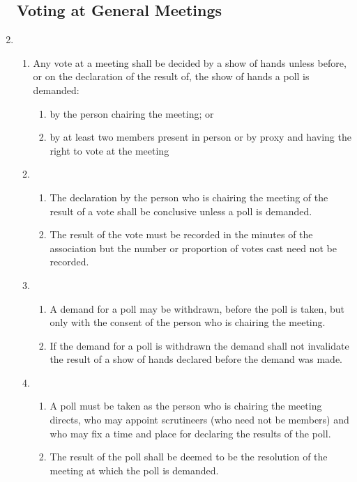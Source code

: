 \begin{enumerate}
\subsection{Voting at General Meetings}
\item
  \begin{enumerate}
  \item
    Any vote at a meeting shall be decided by a show of hands unless
    before, or on the declaration of the result of, the show of hands a
    poll is demanded:
    \begin{enumerate}
    \item
      by the person chairing the meeting; or
    \item
      by at least two members present in person or by proxy and having
      the right to vote at the meeting
    \end{enumerate}
  \item
    \begin{enumerate}
    \item
      The declaration by the person who is chairing the meeting of the
      result of a vote shall be conclusive unless a poll is demanded.
    \item
      The result of the vote must be recorded in the minutes of the
      association but the number or proportion of votes cast need not be
      recorded.
    \end{enumerate}
  \item
    \begin{enumerate}
    \item
      A demand for a poll may be withdrawn, before the poll is taken, but
      only with the consent of the person who is chairing the meeting.
    \item
      If the demand for a poll is withdrawn the demand shall not
      invalidate the result of a show of hands declared before the demand
      was made.
    \end{enumerate}
  \item
    \begin{enumerate}
    \item
      A poll must be taken as the person who is chairing the meeting
      directs, who may appoint scrutineers (who need not be members) and
      who may fix a time and place for declaring the results of the poll.
    \item
      The result of the poll shall be deemed to be the resolution of the
      meeting at which the poll is demanded.
    \end{enumerate}

\end{enumerate}
\end{enumerate}
